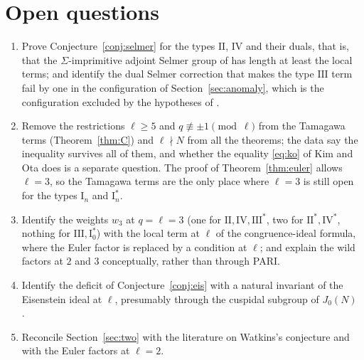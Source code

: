 \documentclass[11pt]{amsart}
\theoremstyle{definition}
\begin{document}
\section{Open questions}
\begin{enumerate}
\item Prove Conjecture~\ref{conj:selmer} for the types $\mathrm{II}$, $\mathrm{IV}$ and their duals, that is, that the $\Sigma$-imprimitive adjoint Selmer group of \cite{DFG04} has length at least the local terms; and identify the dual Selmer correction that makes the type $\mathrm{III}$ term fail by one in the configuration of Section~\ref{sec:anomaly}, which is the configuration excluded by the hypotheses of \cite{KimOta}.
\item Remove the restrictions $\ell\ge5$ and $q\not\equiv\pm1\pmod\ell$ from the Tamagawa terms (Theorem~\ref{thm:C}) and $\ell\nmid N$ from all the theorems; the data say the inequality survives all of them, and whether the equality \eqref{eq:ko} of Kim and Ota does is a separate question. The proof of Theorem~\ref{thm:euler} allows $\ell=3$, so the Tamagawa terms are the only place where $\ell=3$ is still open for the types $\mathrm{I}_n$ and $\mathrm{I}_n^*$.
\item Identify the weights $w_3$ at $q=\ell=3$ (one for $\mathrm{II},\mathrm{IV},\mathrm{III}^*$, two for $\mathrm{II}^*,\mathrm{IV}^*$, nothing for $\mathrm{III},\mathrm{I}_0^*$) with the local term at $\ell$ of the congruence-ideal formula, where the Euler factor is replaced by a condition at $\ell$; and explain the wild factors at $2$ and $3$ conceptually, rather than through PARI.
\item Identify the deficit of Conjecture~\ref{conj:eis} with a natural invariant of the Eisenstein ideal at $\ell$, presumably through the cuspidal subgroup of $J_0(N)$ \cite{Mazur77}.
\item Reconcile Section~\ref{sec:two} with the literature on Watkins's conjecture and with the Euler factors at $\ell=2$.
\end{enumerate}

\appendix
\end{document}
